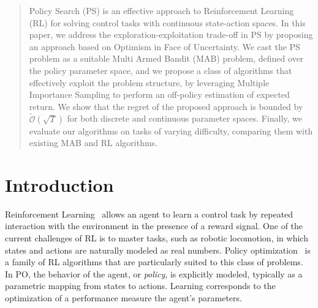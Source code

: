 \documentclass{article}
\begin{document}
\begin{abstract}
Policy Search (PS) is an effective approach to Reinforcement Learning (RL) for solving
control tasks with continuous state-action spaces. In this paper, we address the exploration-exploitation trade-off in PS by proposing an approach based on Optimism in Face of Uncertainty. We cast the PS problem as a suitable Multi Armed Bandit (MAB) problem, defined over the policy parameter space, and we propose a class of algorithms that effectively exploit the problem structure, by leveraging Multiple Importance Sampling to perform an off-policy estimation of expected return.
We show that the regret of the proposed approach is bounded by $\widetilde{\mathcal{O}}(\sqrt{T})$ for both discrete and continuous parameter spaces. Finally, we evaluate our algorithms on tasks of varying difficulty, comparing them with existing MAB and RL algorithms.
\end{abstract} 

\section{Introduction}
Reinforcement Learning~\citep[RL,][]{sutton2018reinforcement} allows an agent to learn a control task by repeated interaction with the environment in the presence of a reward signal. One of the current challenges of RL is to master tasks, such as robotic locomotion, in which states and actions are naturally modeled as real numbers. Policy optimization~\citep[PO,][]{deisenroth2013survey} is a family of RL algorithms that are particularly suited to this class of problems. In PO, the behavior of the agent, or \textit{policy}, is explicitly modeled, typically as a parametric mapping from states to actions. Learning corresponds to the optimization of a performance measure \wrt the agent's parameters. 
\end{document}
